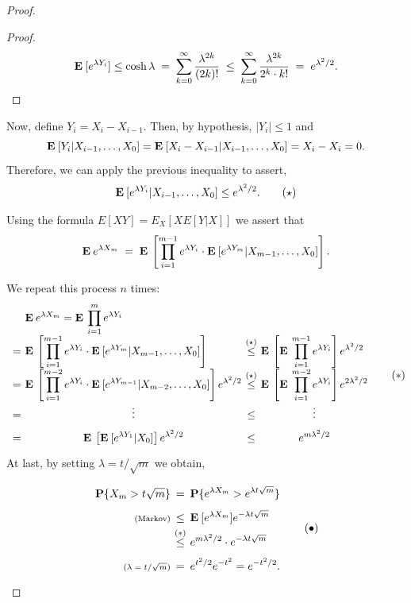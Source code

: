 \begin{proof}
\begin{proof}
    \[
        \mathbf{E}\:[e^{\lambda Y_i}]\leq \cosh \lambda \;=\; \sum_{k = 0}^\infty \frac{\lambda^{2k}}{(2k)!} \;\leq\; \sum_{k = 0}^\infty \frac{\lambda^{2k}}{2^k \cdot k!} \;=\; e^{\lambda^2 / 2}.
    \]

    \end{proof}

    Now, define $Y_i = X_i - X_{i-1}$. Then, by hypothesis, $|Y_i| \leq 1$ and
    \[ \mathbf{E}\: [Y_i | X_{i-1},\ldots, X_0] = \mathbf{E}\: [X_i - X_{i-1} | X_{i-1},\ldots, X_0] = X_i - X_i = 0. \] 
    Therefore, we can apply the previous inequality to assert,
    \[ \mathbf{E}\: [e^{\lambda Y_i} | X_{i-1},\ldots, X_0] \leq e^{\lambda^2/2}. \tag*{$ (\star) $}\]

    Using the formula $E[XY] = E_X [X E[Y|X]]$ we assert that
    \[ \mathbf{E}\: e^{\lambda X_m} \; = \;  \mathbf{E}\:\left[\prod_{i = 1}^{m-1} e^{\lambda Y_i} \cdot \mathbf{E}\:[e^{\lambda Y_m} | X_{m-1},\ldots, X_0]\right]. \]

    We repeat this process $n$ times:
    \[ \everymath{\displaystyle}\arraycolsep=1.8pt\def\arraystretch{1.8}
        \begin{array}{r c c c l}
        & & \E e^{\lambda X_m}  =   \E \prod_{i = 1}^{m} e^{\lambda Y_i} \hfill\\
        & = & \E\left[\prod_{i = 1}^{m-1} e^{\lambda Y_i} \cdot \E[e^{\lambda Y_m} | X_{m-1},\ldots, X_0]\right] \hfill & \overset{(\star)}{\leq} & \E\left[\E \prod_{i = 1}^{m-1} e^{\lambda Y_i} \right] e^{\lambda^2 / 2}\\
        & = & \E\left[\prod_{i = 1}^{m-2} e^{\lambda Y_i} \cdot \E[e^{\lambda Y_{m-1}} | X_{m-2},\ldots, X_0]\right]e^{\lambda^2 / 2} & \overset{(\star)}{\leq} & \E\left[\E \prod_{i = 1}^{m-2} e^{\lambda Y_i} \right] e^{2\lambda^2 / 2}\\
        & = & \hfill\vdots\hfill & \leq & \hfill\vdots\hfill\\
        & = & \E\left[\E[e^{\lambda Y_{1}} |  X_0]\right]e^{\lambda^2 / 2} & \leq & \hfill e^{m\lambda^2/2} \hfill
    \end{array} \tag*{$ (*) $} \]
    At last, by setting $\lambda = t/\sqrt{m}$ we obtain,
    \[ \everymath{\displaystyle}\arraycolsep=1.8pt\def\arraystretch{1.8}
    \begin{array}{r c l}
        \P\{X_m > t\sqrt{m}\} & = & \P\{e^{\lambda X_m} > e^{\lambda t \sqrt{m}}\} \\
        \text{\scriptsize (Markov)}& \leq & \E[e^{\lambda X_m} ] e^{-\lambda t \sqrt{m}}\\
        & \overset{(*)}{\leq} & e^{m\lambda^2/2} \cdot e^{-\lambda t \sqrt{m}}\\
        \text{\scriptsize ($\lambda = t/\sqrt{m}$)} & = & e^{t^2/2} e^{-t^2} = e^{-t^2 / 2}.
    \end{array}    \tag*{$ (\bullet) $}
    \]
\end{proof}

